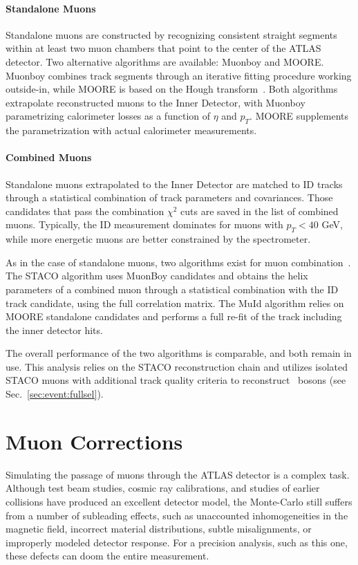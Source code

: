 \paragraph{Standalone Muons}
Standalone muons are constructed by recognizing consistent straight segments within at least two muon chambers that point to the center of the ATLAS detector. Two alternative algorithms are available: Muonboy and MOORE. Muonboy combines track segments through an iterative fitting procedure working outside-in, while MOORE is based on the Hough transform~\cite{leroy2010astroparticle}. Both algorithms extrapolate reconstructed muons to the Inner Detector, with Muonboy parametrizing calorimeter losses as a function of $\eta$ and $p_T$. MOORE supplements the parametrization with actual calorimeter measurements.

\paragraph{Combined Muons}
Standalone muons extrapolated to the Inner Detector are matched to ID tracks through a statistical combination of track parameters and covariances. Those candidates that pass the combination $\chi^2$ cuts are saved in the list of combined muons. Typically, the ID measurement dominates for muons with $p_T<40$ GeV, while more energetic muons are better constrained by the spectrometer.

As in the case of standalone muons, two algorithms exist for muon combination~\cite{muon_tdr}. The STACO algorithm uses MuonBoy candidates and obtains the helix parameters of a combined muon through a statistical combination with the ID track candidate, using the full correlation matrix. The MuId algorithm relies on MOORE standalone candidates and performs a full re-fit of the track including the inner detector hits.

The overall performance of the two algorithms is comparable, and both remain in use. This analysis relies on the STACO reconstruction chain and utilizes isolated STACO muons with additional track quality criteria to reconstruct \Wboson\ bosons (see Sec.~\ref{sec:event:fullsel}).

\section{Muon Corrections}
\label{sec:perf:muoncorr}

Simulating the passage of muons through the ATLAS detector is a complex task. Although test beam studies, cosmic ray calibrations, and studies of earlier collisions have produced an excellent detector model, the Monte-Carlo still suffers from a number of subleading effects, such as unaccounted inhomogeneities in the magnetic field, incorrect material distributions, subtle misalignments, or improperly modeled detector response. For a precision analysis, such as this one, these defects can doom the entire measurement.

